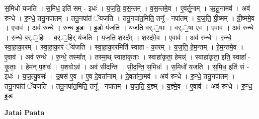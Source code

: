 \documentclass[17pt]{extarticle}
\begin{document}
स॒मिधो॑ यजति । स॒मिध॒ इति॑ सम् - इधः॑ । य॒ज॒ति॒ व॒स॒न्तम् । व॒स॒न्तमे॒व । ए॒वर्तू॒नाम् । ऋ॒तू॒नामव॑ । अव॑ रुन्धे । रु॒न्धे॒ तनू॒नपा॑तम् । तनू॒नपा॑तं ॅयजति । तनू॒नपा॑त॒मिति॒ तनू᳚ - नपा॑तम् । य॒ज॒ति॒ ग्री॒ष्मम् । ग्री॒ष्ममे॒व । ए॒वाव॑ । अव॑ रुन्धे । रु॒न्ध॒ इ॒डः । इ॒डो य॑जति । य॒ज॒ति॒ व॒र्.॒षाः । व॒र्.॒षा ए॒व । ए॒वाव॑ । अव॑ रुन्धे । रु॒न्धे॒ ब॒र्.॒हिः । ब॒र्.॒हिर् य॑जति । य॒ज॒ति॒ श॒रद᳚म् । श॒रद॑मे॒व । ए॒वाव॑ । अव॑ रुन्धे । रु॒न्धे॒ स्वा॒हा॒का॒रम् । स्वा॒हा॒का॒रं ॅय॑जति । स्वा॒हा॒का॒रमिति॑ स्वाहा - का॒रम् । य॒ज॒ति॒ हे॒म॒न्तम् । हे॒म॒न्तमे॒व । ए॒वाव॑ । अव॑ रुन्धे । रु॒न्धे॒ तस्मा᳚त् । तस्मा॒थ् स्वाहा॑कृताः । स्वाहा॑कृता॒ हेमन्न्॑ । स्वाहा॑कृता॒ इति॒ स्वाहा᳚ - कृ॒ताः॒ । हेम॑न् प॒शवः॑ । प॒शवोऽव॑ । अव॑ सीदन्ति । सी॒द॒न्ति॒ स॒मिधः॑ । स॒मिधो॑ यजति । स॒मिध॒ इति॑ सं - इधः॑ । य॒ज॒त्यु॒षसः॑ । उ॒षस॑ ए॒व । ए॒व दे॒वता॑नाम् । दे॒वता॑ना॒मव॑ । अव॑ रुन्धे । रु॒न्धे॒ तनू॒नपा॑तम् । तनू॒नपा॑तं ॅयजति । तनू॒नपा॑त॒मिति॒ तनू᳚ - नपा॑तम् । य॒ज॒ति॒ य॒ज्ञ्म् । य॒ज्ञ्मे॒व । ए॒वाव॑ । अव॑ रुन्धे । रु॒न्ध॒ इ॒डः \newline

\textbf{Jatai Paata} \newline
\end{document}
